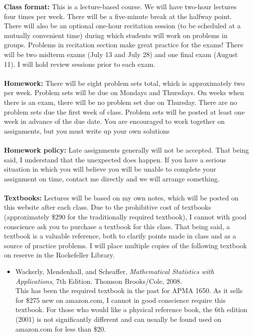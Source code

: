 \documentclass[11pt]{article}
\begin{document}
\textbf {Class format:} This is a lecture-based course. We will have two-hour lectures four times per week. There will be a five-minute break at the halfway point. There will also be an optional one-hour recitation session (to be scheduled at a mutually convenient time) during which students will work on problems in groups. Problems in recitation section make great practice for the exams! There will be two midterm exams (July 13 and July 28) and one final exam (August 11). I will hold review sessions prior to each exam.\\\\
\textbf {Homework: }There will be eight problem sets total, which is approximately two per week. Problem sets will be due on Mondays and Thursdays. On weeks when there is an exam, there will be no problem set due on Thursday. There are no problem sets due the first week of class. Problem sets will be posted at least one week in advance of the due date. You are encouraged to work together on assignments, but you must write up your own solutions \\\\
\textbf{Homework policy: }Late assignments generally will not be accepted. That being said, I understand that the unexpected does happen. If you have a serious situation in which you will believe you will be unable to complete your assignment on time, contact me directly and we will arrange something.\\\\
\textbf {\large Textbooks:} Lectures will be based on my own notes, which will be posted on this website after each class. Due to the prohibitive cost of textbooks (approximately \$290 for the traditionally required textbook), I cannot with good conscience ask you to purchase a textbook for this class. That being said, a textbook is a valuable reference, both to clarify points made in class and as a source of practice problems. I will place multiple copies of the following textbook on reserve in the Rockefeller Library.
\begin{itemize}
\item Wackerly, Mendenhall, and Scheaffer, \emph{Mathematical Statistics with Applications}, 7th Edition. Thomson Brooks/Cole, 2008. \\
This has been the required textbook in the past for APMA 1650. As it sells for \$275 new on amazon.com, I cannot in good conscience require this textbook. For those who would like a physical reference book, the 6th edition (2001) is not significantly different and can usually be found used on amazon.com for less than \$20.
\end{itemize}
\end{document}

